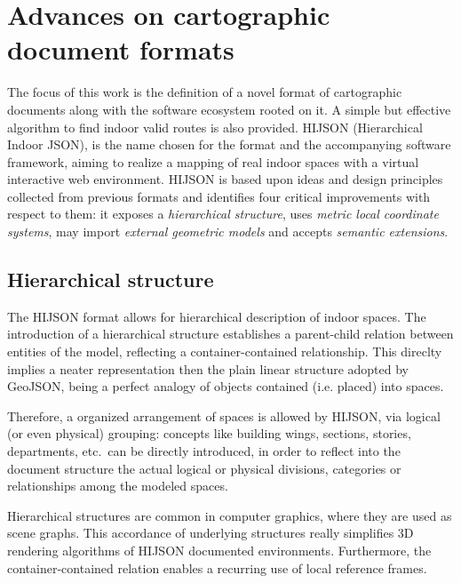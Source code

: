 
\section{Advances on cartographic\\ document formats}\label{advances-on-cartographic-document-format}
\label{advances}

The focus of this work is the definition of a novel format of cartographic
documents along with the software ecosystem rooted on it. A simple but
effective algorithm to find indoor valid routes is also provided.  {HIJSON}
({H}ierarchical {I}ndoor {JSON}),  is the name chosen
for the format and the accompanying software framework, aiming to realize a
mapping of real indoor spaces with a virtual interactive web environment.
HIJSON is based upon ideas and design principles collected from previous
formats and identifies four critical improvements with respect to them: it
exposes a \emph{hierarchical structure}, uses \emph{metric local coordinate
systems}, may import \emph{external geometric models} and accepts \emph{semantic
extensions}. 

\subsection{Hierarchical structure}\label{hierarchical-structure}

The HIJSON format allows for hierarchical description of indoor spaces. The
introduction of a hierarchical structure establishes a parent-child relation
between entities of the model, reflecting a container-contained relationship.
This direclty implies a neater representation then the plain linear structure
adopted by GeoJSON, being a perfect analogy of objects contained (i.e.
placed) into spaces.

Therefore, a  organized arrangement of spaces is allowed by HIJSON, via logical (or even
physical) grouping: concepts like building wings, sections, stories,
departments, etc.~can be directly introduced, in order to reflect into the document structure
the actual logical or physical divisions, categories or relationships among the modeled spaces.

Hierarchical structures are common in computer graphics, where they are used as
scene graphs. This accordance of underlying structures really simplifies 3D
rendering algorithms of HIJSON documented environments.
Furthermore, the container-contained relation enables a recurring use of local reference frames.

